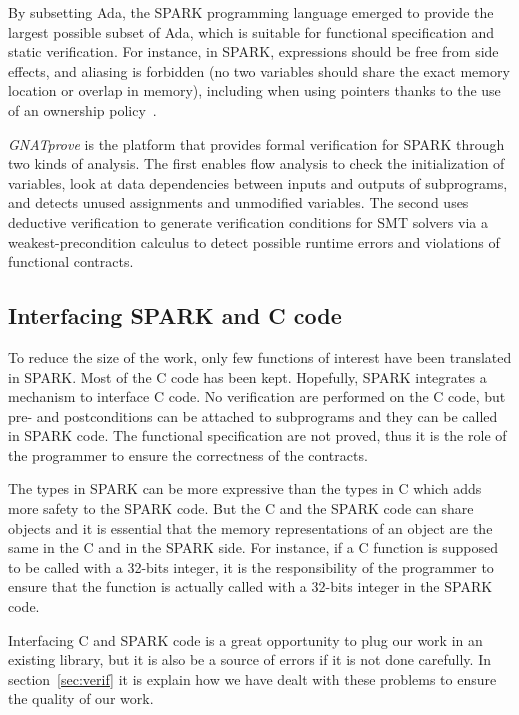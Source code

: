 \documentclass[conference]{IEEEtran}
\begin{document}
By subsetting Ada, the SPARK programming language \cite{mccormick_chapin_2015} emerged to provide the largest possible subset of Ada, which is suitable for functional specification and static verification. For instance, in SPARK, expressions should be free from side effects, and aliasing is forbidden (no two variables should share the exact memory location or overlap in memory), including when using pointers thanks to the use of an ownership policy~\cite{dross2020recursive}.

\emph{GNATprove} \cite{GNATProve:users_manual} is the platform that provides formal verification for SPARK through two kinds of analysis. The first enables flow analysis to check the initialization of variables, look at data dependencies between inputs and outputs of subprograms, and detects unused assignments and unmodified variables. The second uses deductive verification to generate verification conditions for SMT solvers via a weakest-precondition calculus to detect possible runtime errors and violations of functional contracts.

\subsection{Interfacing SPARK and C code}

To reduce the size of the work, only few functions of interest have been
translated in SPARK. Most of the C code has been kept.
Hopefully, SPARK integrates a mechanism to interface C code. No verification are
performed on the C code, but pre- and postconditions can be attached to
subprograms and they can be called in SPARK code.
The functional specification are not proved, thus it is the role of the
programmer to ensure the correctness of the contracts.

The types in SPARK can be more expressive than the types in C which adds more
safety to the SPARK code.
But the C and the SPARK code can share objects and it is essential that the
memory representations of an object are the same in the C and in the SPARK side.
For instance, if a C function is supposed to be called with a 32-bits integer,
it is the responsibility of the programmer to ensure that the function is
actually called with a 32-bits integer in the SPARK code.

Interfacing C and SPARK code is a great opportunity to plug our work in an
existing library, but it is also be a source of errors if it is not done
carefully. In section~\ref{sec:verif} it is explain how we have dealt with these
problems to ensure the quality of our work.
\end{document}
